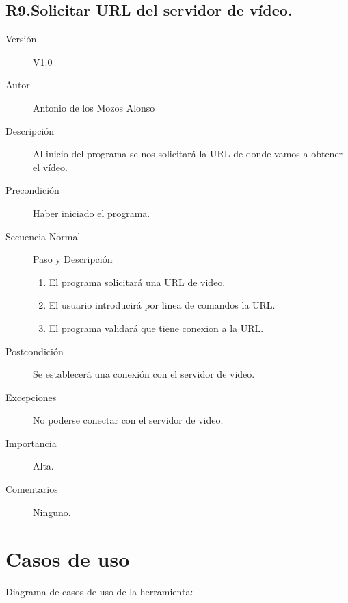 \subsection{R9.Solicitar URL del servidor de vídeo.}
\begin{description}
	\item [Versión] V1.0
	\item [Autor] Antonio de los Mozos Alonso
	\item [Descripción] Al inicio del programa se nos solicitará la URL de donde vamos a obtener el vídeo.
	\item [Precondición] Haber iniciado el programa.
	\item [Secuencia Normal] Paso y Descripción
		\begin{enumerate}
			\item El programa solicitará una URL de video.
			\item El usuario introducirá por linea de comandos la URL.
			\item El programa validará que tiene conexion a la URL.
		\end{enumerate}
	\item [Postcondición] Se establecerá una conexión con el servidor de video.
	\item [Excepciones] No poderse conectar con el servidor de video.
	\item [Importancia] Alta.
	\item [Comentarios] Ninguno.
\end{description}

\section{Casos de uso}
Diagrama de casos de uso de la herramienta:


